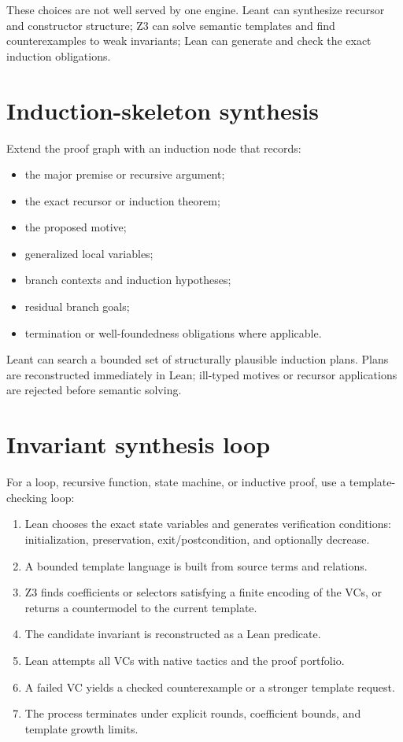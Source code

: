 \documentclass[11pt,letterpaper,openany]{report}
\begin{document}
These choices are not well served by one engine. Leant can synthesize recursor and
constructor structure; Z3 can solve semantic templates and find counterexamples to
weak invariants; Lean can generate and check the exact induction obligations.

\section{Induction-skeleton synthesis}

Extend the proof graph with an induction node that records:

\begin{itemize}
  \item the major premise or recursive argument;
  \item the exact recursor or induction theorem;
  \item the proposed motive;
  \item generalized local variables;
  \item branch contexts and induction hypotheses;
  \item residual branch goals;
  \item termination or well-foundedness obligations where applicable.
\end{itemize}

Leant can search a bounded set of structurally plausible induction plans. Plans are
reconstructed immediately in Lean; ill-typed motives or recursor applications are
rejected before semantic solving.

\section{Invariant synthesis loop}

For a loop, recursive function, state machine, or inductive proof, use a template-
checking loop:

\begin{enumerate}
  \item Lean chooses the exact state variables and generates verification conditions:
        initialization, preservation, exit/postcondition, and optionally decrease.
  \item A bounded template language is built from source terms and relations.
  \item Z3 finds coefficients or selectors satisfying a finite encoding of the VCs, or
        returns a countermodel to the current template.
  \item The candidate invariant is reconstructed as a Lean predicate.
  \item Lean attempts all VCs with native tactics and the proof portfolio.
  \item A failed VC yields a checked counterexample or a stronger template request.
  \item The process terminates under explicit rounds, coefficient bounds, and template
        growth limits.
\end{enumerate}
\end{document}
